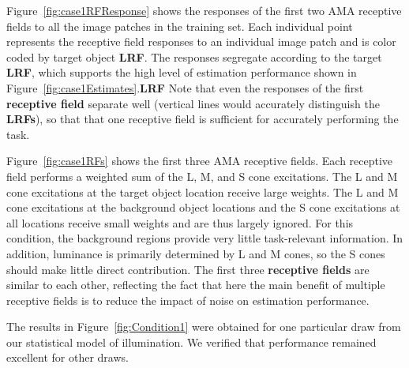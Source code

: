 \documentclass{jov}
\providecommand{\DIFaddtex}[1]{{\bf #1}} %
\providecommand{\DIFdeltex}[1]{} %
\providecommand{\DIFaddbegin}{} %
\providecommand{\DIFaddend}{} %
\providecommand{\DIFdelbegin}{} %
\providecommand{\DIFdelend}{} %
\providecommand{\DIFadd}[1]{\texorpdfstring{\DIFaddtex{#1}}{#1}} %
\providecommand{\DIFdel}[1]{\texorpdfstring{\DIFdeltex{#1}}{}} %
\newcommand{\DIFscaledelfig}{0.5}
\newlength{\DIFdelgraphicswidth} %
\newlength{\DIFdelgraphicsheight} %
\newcommand{\DIFaddincludegraphics}[2][]{{\color{blue}\fbox{\DIFOincludegraphics[#1]{#2}}}} %
\newcommand{\DIFdelincludegraphics}[2][]{%
\sbox{\DIFdelgraphicsbox}{\DIFOincludegraphics[#1]{#2}}%
\settoboxwidth{\DIFdelgraphicswidth}{\DIFdelgraphicsbox} %
\settoboxtotalheight{\DIFdelgraphicsheight}{\DIFdelgraphicsbox} %
\scalebox{\DIFscaledelfig}{%
\parbox[b]{\DIFdelgraphicswidth}{\usebox{\DIFdelgraphicsbox}\\[-\baselineskip] \rule{\DIFdelgraphicswidth}{0em}}\llap{\resizebox{\DIFdelgraphicswidth}{\DIFdelgraphicsheight}{%
\setlength{\unitlength}{\DIFdelgraphicswidth}%
\begin{picture}(1,1)%
\thicklines\linethickness{2pt} %
{\color[rgb]{1,0,0}\put(0,0){\framebox(1,1){}}}%
{\color[rgb]{1,0,0}\put(0,0){\line( 1,1){1}}}%
{\color[rgb]{1,0,0}\put(0,1){\line(1,-1){1}}}%
\end{picture}%
}\hspace*{3pt}}} %
} %
\DeclareRobustCommand{\DIFaddbegin}{\DIFOaddbegin \let\includegraphics\DIFaddincludegraphics} %
\DeclareRobustCommand{\DIFaddend}{\DIFOaddend \let\includegraphics\DIFOincludegraphics} %
\DeclareRobustCommand{\DIFdelbegin}{\DIFOdelbegin \let\includegraphics\DIFdelincludegraphics} %
\DeclareRobustCommand{\DIFdelend}{\DIFOaddend \let\includegraphics\DIFOincludegraphics} %
\begin{document}
Figure~\ref{fig:case1RFResponse} shows the responses of the first two AMA receptive fields to all the image patches in the training set.
Each individual point represents the receptive field responses to an individual image patch and
is color coded by target object \DIFdelbegin \DIFdel{LRV}\DIFdelend \DIFaddbegin \DIFadd{LRF}\DIFaddend .
The responses segregate according to the target \DIFdelbegin \DIFdel{LRV}\DIFdelend \DIFaddbegin \DIFadd{LRF}\DIFaddend , which supports the high level 
of estimation performance shown in Figure~\ref{fig:case1Estimates}.\DIFaddbegin \DIFadd{LRF
}\DIFaddend Note that even the responses of the first \DIFdelbegin \DIFdel{RF }\DIFdelend \DIFaddbegin \DIFadd{receptive field }\DIFaddend separate well (vertical lines would accurately
distinguish the \DIFdelbegin \DIFdel{LRVs}\DIFdelend \DIFaddbegin \DIFadd{LRFs}\DIFaddend ), so that that one receptive field is sufficient for accurately performing the task.

Figure~\ref{fig:case1RFs} shows the first three AMA receptive fields.
Each receptive field performs a weighted sum of the L, M, and S cone excitations.
The L and M cone excitations at the target object location receive large weights.
The L and M cone excitations at the background object locations and the S cone excitations at all locations receive small weights and are thus largely ignored. 
For this condition, the background regions provide very little task-relevant information. 
In addition, luminance is primarily determined by L and M cones, so the S cones should make little
direct contribution.
The first three \DIFdelbegin \DIFdel{RFs }\DIFdelend \DIFaddbegin \DIFadd{receptive fields }\DIFaddend are similar to each other, reflecting the fact that here the main benefit
of multiple receptive fields is to reduce the impact of noise on estimation performance.

The results in Figure~\ref{fig:Condition1} were obtained for one particular draw from our statistical model of illumination.
We verified that performance remained excellent for other draws.
\end{document}

